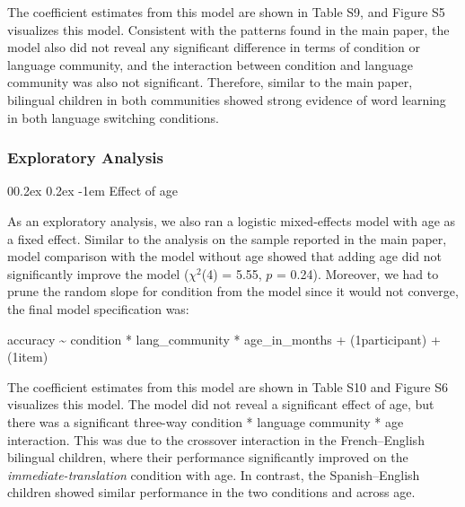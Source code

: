 \documentclass[
  man,floatsintext]{apa7}
\makeatletter
\let\oldparagraph\paragraph
\renewcommand{\paragraph}[1]{\oldparagraph{#1}\mbox{}}
\renewcommand{\paragraph}{\@startsection{paragraph}{4}{\parindent}%
  {0\baselineskip \@plus 0.2ex \@minus 0.2ex}%
  {-1em}%
  {\normalfont\normalsize\bfseries\itshape\typesectitle}}
\renewcommand{\paragraph}{\@startsection{paragraph}{4}{\parindent}%
  {0\baselineskip \@plus 0.2ex \@minus 0.2ex}%
  {-1em}%
  {\normalfont\normalsize\bfseries\typesectitle}}
\makeatother
\begin{document}
\noindent The coefficient estimates from this model are shown in Table S9, and Figure S5 visualizes this model. Consistent with the patterns found in the main paper, the model also did not reveal any significant difference in terms of condition or language community, and the interaction between condition and language community was also not significant. Therefore, similar to the main paper, bilingual children in both communities showed strong evidence of word learning in both language switching conditions.

\hypertarget{exploratory-analysis}{%
\subsubsection{Exploratory Analysis}\label{exploratory-analysis}}

\hypertarget{effect-of-age-1}{%
\paragraph{Effect of age}\label{effect-of-age-1}}

As an exploratory analysis, we also ran a logistic mixed-effects model with age as a fixed effect. Similar to the analysis on the sample reported in the main paper, model comparison with the model without age showed that adding age did not significantly improve the model (\(\chi^2\)(4) = 5.55, \(p\) = 0.24). Moreover, we had to prune the random slope for condition from the model since it would not converge, the final model specification was:

accuracy \textasciitilde{} condition * lang\_community * age\_in\_months + (1\textbar participant) + (1\textbar item)

\noindent The coefficient estimates from this model are shown in Table S10 and Figure S6 visualizes this model. The model did not reveal a significant effect of age, but there was a significant three-way condition * language community * age interaction. This was due to the crossover interaction in the French--English bilingual children, where their performance significantly improved on the \emph{immediate-translation} condition with age. In contrast, the Spanish--English children showed similar performance in the two conditions and across age.
\end{document}
